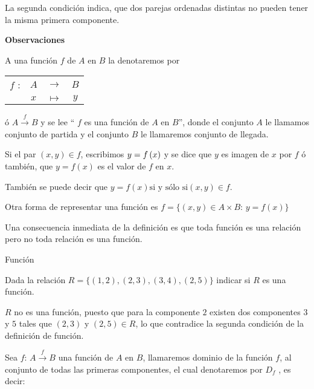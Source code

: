 \nota La segunda condición indica, que dos parejas ordenadas distintas
no pueden tener la misma primera componente. 

\textbf{Observaciones}

\begin{lista}

\item A una función $f$ de $A$ en $B$ la denotaremos por %
\begin{tabular}{cccc}
$f$ : & $A$ & $\rightarrow$ & %
$B$%
\tabularnewline
 & $x$ & $\mapsto$ & $y$\tabularnewline
\end{tabular} ó $A\overset{f}{\rightarrow}B$ y se lee `` $f$ es una función
de $A$ en $B$'', donde el conjunto $A$ le llamamos conjunto de
partida y el conjunto $B$ le llamaremos conjunto de llegada.

\item  Si el par $\left(x,y\right)\in f$, escribimos $y=\mbox{\ensuremath{f\left(x\right)}}$
y se dice que $y$ es imagen de $x$ por $f$ ó también, que $y=f\left(x\right)$
es el valor de $f$ en $x.$ 

\item También se puede decir que $y=f\left(x\right)\mbox{si y sólo si}\left(x,y\right)\in f.$

\item  Otra forma de representar una función es $f=\{\left(x,y\right)\in A\times B:\, y=f\left(x\right)\}$

\item Una consecuencia inmediata de la definición es que toda función
es una relación pero no toda relación es una función.

\end{lista}

\begin{ejem}{Función}

Dada la relación $R=\{\left(1,2\right),\left(2,3\right),\left(3,4\right),\left(2,5\right)\}$
indicar si $R$ es una función. \end{ejem}

\solucion $R$ no es una función, puesto que para la componente $2$
existen dos componentes $3$ y $5$ tales que $\left(2,3\right)$
y $\left(2,5\right)\in R$, lo que contradice la segunda condición
de la definición de función.

\nota Sea $f:\, A\overset{f}{\rightarrow}B$ una función de $A$
en $B$, llamaremos dominio de la función $f$, al conjunto de todas
las primeras componentes, el cual denotaremos por $D_{f}$ , es decir:

